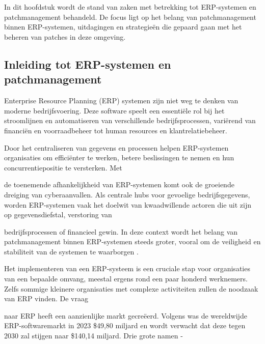 \chapter{}
\label{ch:stand-van-zaken}


In dit hoofdstuk wordt de stand van zaken met betrekking tot ERP-systemen en patchmanagement behandeld. De focus ligt op het belang van patchmanagement binnen ERP-systemen, uitdagingen en strategieën die gepaard gaan met het beheren van patches in deze omgeving.

\section{Inleiding tot ERP-systemen en patchmanagement}
Enterprise Resource Planning (ERP) systemen zijn niet weg te denken van moderne bedrijfsvoering. Deze software speelt een essentiële rol bij het stroomlijnen en automatiseren van verschillende bedrijfsprocessen, variërend van financiën en voorraadbeheer tot human resources en klantrelatiebeheer.

Door het centraliseren van gegevens en processen helpen ERP-systemen organisaties om efficiënter te werken, betere beslissingen te nemen en hun concurrentiepositie te versterken. Met

de toenemende afhankelijkheid van ERP-systemen komt ook de groeiende dreiging van cyberaanvallen. Als centrale hubs voor gevoelige bedrijfsgegevens, worden ERP-systemen vaak het doelwit van kwaadwillende actoren die uit zijn op gegevensdiefstal, verstoring van 

bedrijfsprocessen of financieel gewin. In deze context wordt het belang van patchmanagement binnen ERP-systemen steeds groter, vooral om de veiligheid en stabiliteit van de systemen te waarborgen \autocite{Pearson2024}.

Het implementeren van een ERP-systeem is een cruciale stap voor organisaties van een bepaalde omvang, meestal ergens rond een paar honderd werknemers. Zelfs sommige kleinere organisaties met complexe activiteiten zullen de noodzaak van ERP vinden. De vraag 

naar ERP heeft een aanzienlijke markt gecreëerd. Volgens \textcite{Madh2024} was de wereldwijde ERP-softwaremarkt in 2023 \$49,80 miljard en wordt verwacht dat deze tegen 2030 zal stijgen naar \$140,14 miljard. Drie grote namen - 


